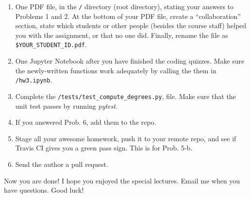 \documentclass[10pt]{article}
\begin{document}
\begin{enumerate}
	\item{One PDF file, in the \texttt{/} directory (root directory), stating your answers to Problems 1 and 2. At the bottom of your PDF file, create a ``collaboration'' section, state which students or other people (besides the course staff) helped you with the assignment, or that no one did. Finally, rename the file as \texttt{\$YOUR\_STUDENT\_ID.pdf}.}
	\item{One Jupyter Notebook after you have finished the coding quizzes. Make sure the newly-written functions work adequately by calling the them in \texttt{/hw3.ipynb}.}
	\item{Complete the \texttt{/tests/test\_compute\_degrees.py}, file. Make sure that the unit test passes by running {\it pytest}.}
	\item{If you answered Prob. 6, add them to the repo.}
	\item{Stage all your awesome homework, push it to your remote repo, and see if Travis CI gives you a green pass sign. This is for Prob. 5-b.}
	\item{Send the author a pull request.}
\end{enumerate}

Now you are done! I hope you enjoyed the special lectures. Email me when you have questions. Good luck!
\end{document}
